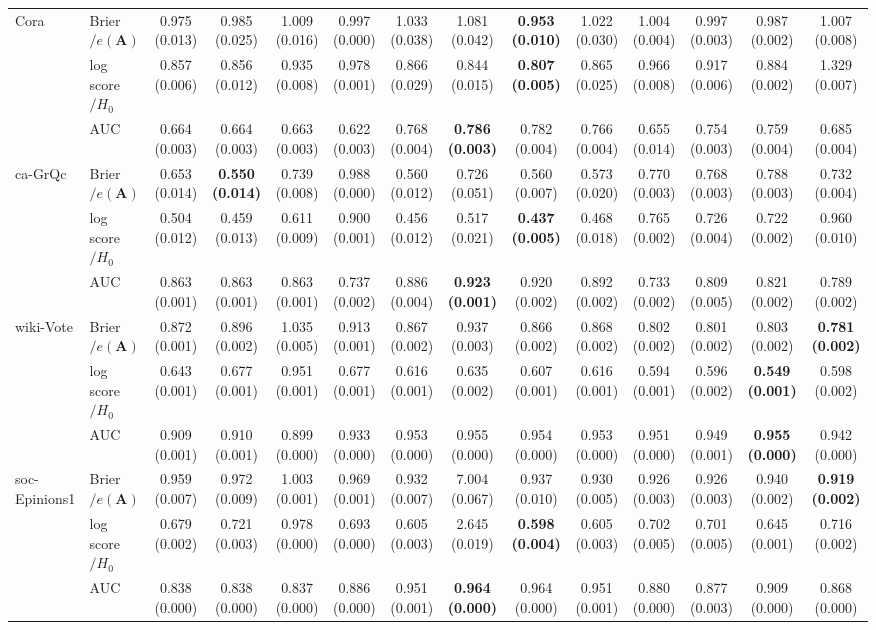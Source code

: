 \documentclass[12pt]{article}
\begin{document}
\begin{table}[ht]
\begin{tabular}{llcccccccccccc}
Cora & Brier$/e(\mathbf{A})$ & 0.975 (0.013) & 0.985 (0.025) & 1.009 (0.016) & 0.997 (0.000) & 1.033 (0.038) & 1.081 (0.042) & \textbf{0.953 (0.010)} & 1.022 (0.030) & 1.004 (0.004) & 0.997 (0.003) & 0.987 (0.002) & 1.007 (0.008) \\
 & log score$/H_0$ & 0.857 (0.006) & 0.856 (0.012) & 0.935 (0.008) & 0.978 (0.001) & 0.866 (0.029) & 0.844 (0.015) & \textbf{0.807 (0.005)} & 0.865 (0.025) & 0.966 (0.008) & 0.917 (0.006) & 0.884 (0.002) & 1.329 (0.007) \\
 & AUC & 0.664 (0.003) & 0.664 (0.003) & 0.663 (0.003) & 0.622 (0.003) & 0.768 (0.004) & \textbf{0.786 (0.003)} & 0.782 (0.004) & 0.766 (0.004) & 0.655 (0.014) & 0.754 (0.003) & 0.759 (0.004) & 0.685 (0.004) \\
ca-GrQc & Brier$/e(\mathbf{A})$ & 0.653 (0.014) & \textbf{0.550 (0.014)} & 0.739 (0.008) & 0.988 (0.000) & 0.560 (0.012) & 0.726 (0.051) & 0.560 (0.007) & 0.573 (0.020) & 0.770 (0.003) & 0.768 (0.003) & 0.788 (0.003) & 0.732 (0.004) \\
 & log score$/H_0$ & 0.504 (0.012) & 0.459 (0.013) & 0.611 (0.009) & 0.900 (0.001) & 0.456 (0.012) & 0.517 (0.021) & \textbf{0.437 (0.005)} & 0.468 (0.018) & 0.765 (0.002) & 0.726 (0.004) & 0.722 (0.002) & 0.960 (0.010) \\
 & AUC & 0.863 (0.001) & 0.863 (0.001) & 0.863 (0.001) & 0.737 (0.002) & 0.886 (0.004) & \textbf{0.923 (0.001)} & 0.920 (0.002) & 0.892 (0.002) & 0.733 (0.002) & 0.809 (0.005) & 0.821 (0.002) & 0.789 (0.002) \\
wiki-Vote & Brier$/e(\mathbf{A})$ & 0.872 (0.001) & 0.896 (0.002) & 1.035 (0.005) & 0.913 (0.001) & 0.867 (0.002) & 0.937 (0.003) & 0.866 (0.002) & 0.868 (0.002) & 0.802 (0.002) & 0.801 (0.002) & 0.803 (0.002) & \textbf{0.781 (0.002)} \\
 & log score$/H_0$ & 0.643 (0.001) & 0.677 (0.001) & 0.951 (0.001) & 0.677 (0.001) & 0.616 (0.001) & 0.635 (0.002) & 0.607 (0.001) & 0.616 (0.001) & 0.594 (0.001) & 0.596 (0.002) & \textbf{0.549 (0.001)} & 0.598 (0.002) \\
 & AUC & 0.909 (0.001) & 0.910 (0.001) & 0.899 (0.000) & 0.933 (0.000) & 0.953 (0.000) & 0.955 (0.000) & 0.954 (0.000) & 0.953 (0.000) & 0.951 (0.000) & 0.949 (0.001) & \textbf{0.955 (0.000)} & 0.942 (0.000) \\
soc-Epinions1 & Brier$/e(\mathbf{A})$ & 0.959 (0.007) & 0.972 (0.009) & 1.003 (0.001) & 0.969 (0.001) & 0.932 (0.007) & 7.004 (0.067) & 0.937 (0.010) & 0.930 (0.005) & 0.926 (0.003) & 0.926 (0.003) & 0.940 (0.002) & \textbf{0.919 (0.002)} \\
 & log score$/H_0$ & 0.679 (0.002) & 0.721 (0.003) & 0.978 (0.000) & 0.693 (0.000) & 0.605 (0.003) & 2.645 (0.019) & \textbf{0.598 (0.004)} & 0.605 (0.003) & 0.702 (0.005) & 0.701 (0.005) & 0.645 (0.001) & 0.716 (0.002) \\
 & AUC & 0.838 (0.000) & 0.838 (0.000) & 0.837 (0.000) & 0.886 (0.000) & 0.951 (0.001) & \textbf{0.964 (0.000)} & 0.964 (0.000) & 0.951 (0.001) & 0.880 (0.000) & 0.877 (0.003) & 0.909 (0.000) & 0.868 (0.000) \\
\bottomrule
\end{tabular}


\end{table}
\end{document}
